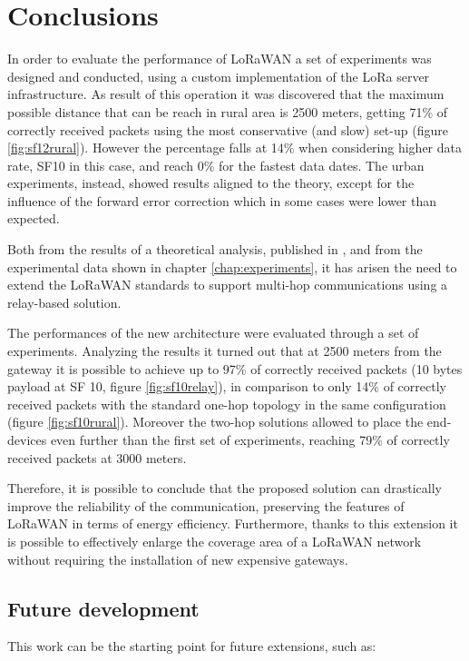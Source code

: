 \chapter{Conclusions}

In order to evaluate the performance of LoRaWAN a set of experiments was designed and conducted, using a custom implementation of the LoRa server infrastructure. As result of this operation it was discovered that the maximum possible distance that can be reach in rural area is 2500 meters, getting 71\% of correctly received packets using the most conservative (and slow) set-up (figure \ref{fig:sf12rural}). However the percentage falls at 14\% when considering higher data rate, SF10 in this case, and reach 0\% for the fastest data dates. The urban experiments, instead, showed results aligned to the theory, except for the influence of the forward error correction which in some cases were lower than expected.

Both from the results of a theoretical analysis, published in \cite{lorawanlimits}, and from the experimental data shown in chapter \ref{chap:experiments}, it has arisen the need to extend the LoRaWAN standards to support multi-hop communications using a relay-based solution.

The performances of the new architecture were evaluated through a set of experiments. Analyzing the results it turned out that at 2500 meters from the gateway it is possible to achieve up to 97\% of correctly received packets (10 bytes payload at SF 10, figure \ref{fig:sf10relay}), in comparison to only 14\% of correctly received packets with the standard one-hop topology in the same configuration (figure \ref{fig:sf10rural}). Moreover the two-hop solutions allowed to place the end-devices even further than the first set of experiments, reaching 79\% of correctly received packets at 3000 meters.

Therefore, it is possible to conclude that the proposed solution can drastically improve the reliability of the communication, preserving the features of LoRaWAN in terms of energy efficiency. Furthermore, thanks to this extension it is possible to effectively enlarge the coverage area of a LoRaWAN network without requiring the installation of new expensive gateways.

\section{Future development}
This work can be the starting point for future extensions, such as:

